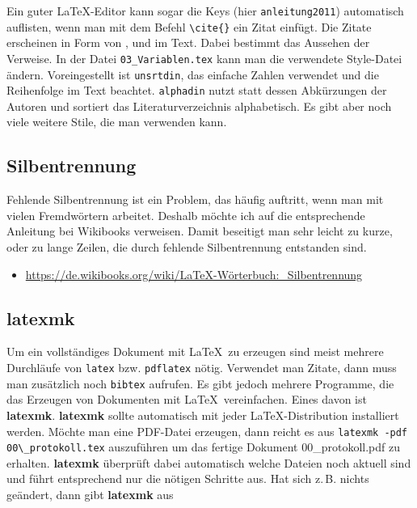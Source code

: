 Ein guter LaTeX-Editor kann sogar die Keys (hier \verb+anleitung2011+) automatisch auflisten, wenn man mit dem Befehl \verb+\cite{}+ ein Zitat einfügt. Die Zitate erscheinen in Form von \cite{heil2012}, \cite{anleitung2012} und \cite{anleitung2013} im Text. Dabei bestimmt \verb++ das Aussehen der Verweise. In der Datei \verb+03_Variablen.tex+ kann man die verwendete Style-Datei ändern. Voreingestellt ist \verb+unsrtdin+, das einfache Zahlen verwendet und die Reihenfolge im Text beachtet. \verb+alphadin+ nutzt statt dessen Abkürzungen der Autoren und sortiert das Literaturverzeichnis alphabetisch. Es gibt aber noch viele weitere Stile, die man verwenden kann.

\subsection{Silbentrennung}

Fehlende Silbentrennung ist ein Problem, das häufig auftritt, wenn man mit vielen Fremdwörtern arbeitet. Deshalb möchte ich auf die entsprechende Anleitung bei Wikibooks verweisen. Damit beseitigt man sehr leicht zu kurze, oder zu lange Zeilen, die durch fehlende Silbentrennung entstanden sind.

\begin{itemize}
    \item \url{https://de.wikibooks.org/wiki/LaTeX-Wörterbuch:_Silbentrennung}
\end{itemize}

\subsection{latexmk}

Um ein vollständiges Dokument mit \LaTeX\ zu erzeugen sind meist mehrere Durchläufe von \verb+latex+ bzw. \verb+pdflatex+ nötig. Verwendet man Zitate, dann muss man zusätzlich noch \verb+bibtex+ aufrufen. Es gibt jedoch mehrere Programme, die das Erzeugen von Dokumenten mit \LaTeX\ vereinfachen. Eines davon ist \textbf{latexmk}. \textbf{latexmk} sollte automatisch mit jeder \LaTeX-Distribution installiert werden. Möchte man eine PDF-Datei erzeugen, dann reicht es aus \verb+latexmk -pdf 00\_protokoll.tex+ auszuführen um das fertige Dokument 00\_protokoll.pdf zu erhalten. \textbf{latexmk} überprüft dabei automatisch welche Dateien noch aktuell sind und führt entsprechend nur die nötigen Schritte aus. Hat sich z.\,B. nichts geändert, dann gibt \textbf{latexmk} aus 

